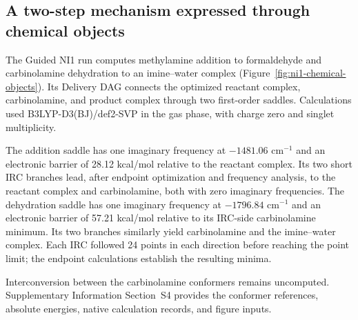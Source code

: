 \subsection{A two-step mechanism expressed through chemical objects}
\label{sec:ni1-chemical-objects}

The Guided NI1 run computes methylamine addition to formaldehyde and carbinolamine dehydration to an imine--water complex (Figure~\ref{fig:ni1-chemical-objects}). Its Delivery DAG connects the optimized reactant complex, carbinolamine, and product complex through two first-order saddles. Calculations used B3LYP-D3(BJ)/def2-SVP in the gas phase, with charge zero and singlet multiplicity.

The addition saddle has one imaginary frequency at $-1481.06$ cm$^{-1}$ and an electronic barrier of 28.12 kcal/mol relative to the reactant complex. Its two short IRC branches lead, after endpoint optimization and frequency analysis, to the reactant complex and carbinolamine, both with zero imaginary frequencies. The dehydration saddle has one imaginary frequency at $-1796.84$ cm$^{-1}$ and an electronic barrier of 57.21 kcal/mol relative to its IRC-side carbinolamine minimum. Its two branches similarly yield carbinolamine and the imine--water complex. Each IRC followed 24 points in each direction before reaching the point limit; the endpoint calculations establish the resulting minima.

Interconversion between the carbinolamine conformers remains uncomputed. Supplementary Information Section~S4 provides the conformer references, absolute energies, native calculation records, and figure inputs.


